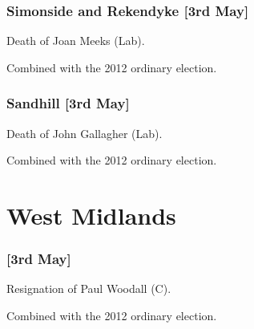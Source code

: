 \begin{resultsiii}
\subsubsection*{Simonside and Rekendyke \hspace*{\fill}\nolinebreak[1]%
\enspace\hspace*{\fill}
[3rd May]}


Death of Joan Meeks (Lab).

Combined with the 2012 ordinary election.


\subsubsection*{Sandhill \hspace*{\fill}\nolinebreak[1]%
\enspace\hspace*{\fill}
[3rd May]}


Death of John Gallagher (Lab).

Combined with the 2012 ordinary election.



\section{West Midlands}


\subsubsection*{ \hspace*{\fill}\nolinebreak[1]%
\enspace\hspace*{\fill}
[3rd May]}


Resignation of Paul Woodall (C).

Combined with the 2012 ordinary election.


\end{resultsiii}
